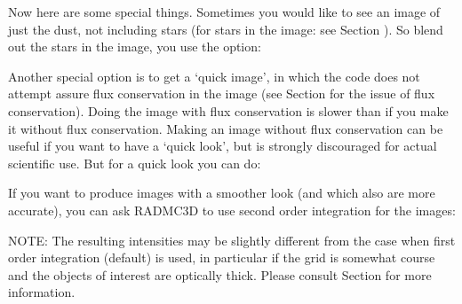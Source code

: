 \documentclass[letterpaper,10pt,english]{sphinxmanual}
\begin{document}
Now here are some special things. Sometimes you would like to see an image of
just the dust, not including stars (for stars in the image: see Section
{\hyperref[\detokenize{imagesspectra:sec-image-stars}]{}}). So blend out the stars in the image, you use the
 option:

\begin{sphinxVerbatim}[commandchars=\\\{\}]
        
\end{sphinxVerbatim}

Another special option is to get a ‘quick image’, in which the code does not
attempt assure flux conservation in the image (see Section
{\hyperref[\detokenize{imagesspectra:sec-image-refinement}]{}} for the issue of flux conservation). Doing the image
with flux conservation is slower than if you make it without flux
conservation. Making an image without flux conservation can be useful if you
want to have a ‘quick look’, but is strongly discouraged for actual scientific
use. But for a quick look you can do:

\begin{sphinxVerbatim}[commandchars=\\\{\}]
        
\end{sphinxVerbatim}

If you want to produce images with a smoother look (and which also are more
accurate), you can ask RADMC\sphinxhyphen{}3D to use second order integration for the images:

\begin{sphinxVerbatim}[commandchars=\\\{\}]
        
\end{sphinxVerbatim}

NOTE: The resulting intensities may be slightly different from the case when
first order integration (default) is used, in particular if the grid is somewhat
course and the objects of interest are optically thick.  Please consult Section
{\hyperref[\detokenize{imagesspectra:sec-second-order}]{}} for more information.
\end{document}
